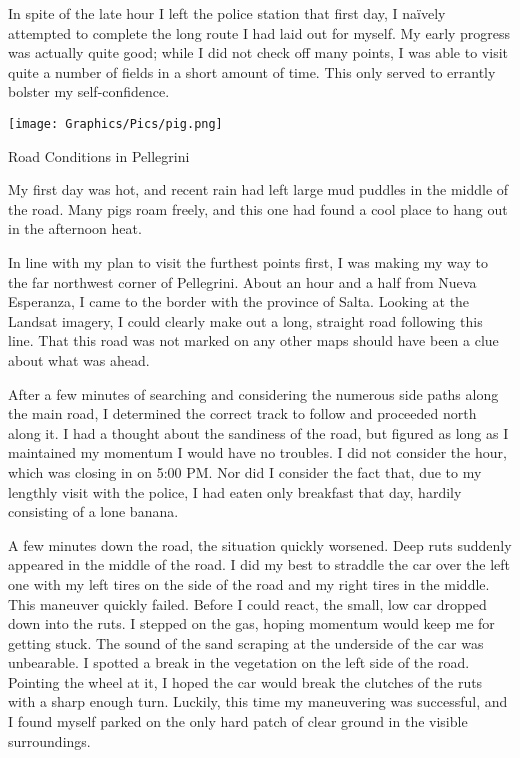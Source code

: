 In spite of the late hour I left the police station that first day, I naïvely attempted to complete the long route I had laid out for myself. My early progress was actually quite good; while I did not check off many points, I was able to visit quite a number of fields in a short amount of time. This only served to errantly bolster my self-confidence.

\begin{ssfigure}
  \centering
  \texttt{[image: Graphics/Pics/pig.png]}
  \caption{Road Conditions in Pellegrini}
  \label{pic:roadpig}
  \medskip
  \small
  My first day was hot, and recent rain had left large mud puddles in the middle of the road. Many pigs roam freely, and this one had found a cool place to hang out in the afternoon heat.
\end{ssfigure}

In line with my plan to visit the furthest points first, I was making my way to the far northwest corner of Pellegrini. About an hour and a half from Nueva Esperanza, I came to the border with the province of Salta. Looking at the Landsat imagery, I could clearly make out a long, straight road following this line. That this road was not marked on any other maps should have been a clue about what was ahead.

After a few minutes of searching and considering the numerous side paths along the main road, I determined the correct track to follow and proceeded north along it. I had a thought about the sandiness of the road, but figured as long as I maintained my momentum I would have no troubles. I did not consider the hour, which was closing in on 5:00 PM. Nor did I consider the fact that, due to my lengthly visit with the police, I had eaten only breakfast that day, hardily consisting of a lone banana.

A few minutes down the road, the situation quickly worsened. Deep ruts suddenly appeared in the middle of the road. I did my best to straddle the car over the left one with my left tires on the side of the road and my right tires in the middle. This maneuver quickly failed. Before I could react, the small, low car dropped down into the ruts. I stepped on the gas, hoping momentum would keep me for getting stuck. The sound of the sand scraping at the underside of the car was unbearable. I spotted a break in the vegetation on the left side of the road. Pointing the wheel at it, I hoped the car would break the clutches of the ruts with a sharp enough turn. Luckily, this time my maneuvering was successful, and I found myself parked on the only hard patch of clear ground in the visible surroundings.

